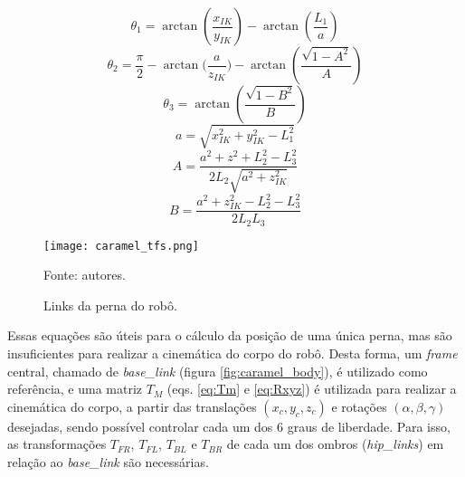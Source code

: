 \documentclass[../main.tex]{subfiles}
\begin{document}
\begin{equation}
  \label{eq:theta1}
  \theta_1 = \arctan{(\frac{x_{IK}}{y_{IK}})} - \arctan{(\frac{L_1}{a})}
\end{equation}
\begin{equation}
  \label{eq:theta2}
  \theta_2 = \frac{\pi}{2} - \arctan{(\frac{a}{z_{IK}}}) - \arctan{(\frac{\sqrt{1-A^2}}{A})}
\end{equation}
\begin{equation}
  \label{eq:theta3}
  \theta_3 = \arctan(\frac{\sqrt{1-B^2}}{B})
\end{equation}
\begin{equation}
  \label{eq:a}
  a = \sqrt{x_{IK}^2+y_{IK}^2-L_1^2}
\end{equation}
\begin{equation}
  \label{eq:A}
  A =\frac{a^2+z^2+L_2^2-L_3^2}{2L_2\sqrt{a^2+z_{IK}^2}}
\end{equation}
\begin{equation}
  \label{eq:B}
  B = \frac{a^2+z_{IK}^2-L_2^2-L_3^2}{2L_2L_3}
\end{equation}

\begin{figure}[!htb]
  \centering
  \caption{Links da perna do robô.}
  \texttt{[image: caramel\_tfs.png]}

  Fonte: autores.
  \label{fig:caramel_tfs}
\end{figure}

Essas equações são úteis para o cálculo da posição de uma única perna, mas são insuficientes para realizar a cinemática do corpo do robô. Desta forma, um \textit{frame} central, chamado de \textit{base\_link} (figura \ref{fig:caramel_body}), é utilizado como referência, e uma matriz $T_M$ (eqs. \ref{eq:Tm} e \ref{eq:Rxyz}) é utilizada para realizar a cinemática do corpo, a partir das translações $(x_c, y_c, z_c)$ e rotações $(\alpha, \beta, \gamma)$ desejadas, sendo possível controlar cada um dos 6 graus de liberdade. Para isso, as transformações $T_{FR}$, $T_{FL}$, $T_{BL}$ e $T_{BR}$ de cada um dos ombros (\textit{hip\_links}) em relação ao \textit{base\_link} são necessárias.
\end{document}
